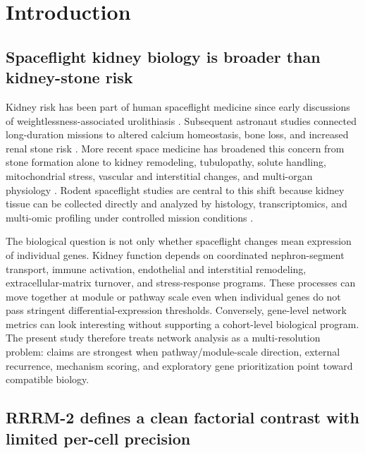 \documentclass[11pt]{article}
\begin{document}
\clearpage
\tableofcontents
\clearpage

\section{Introduction}

\subsection{Spaceflight kidney biology is broader than kidney-stone risk}

Kidney risk has been part of human spaceflight medicine since early discussions of weightlessness-associated urolithiasis \citep{cockett1962astronautical}. Subsequent astronaut studies connected long-duration missions to altered calcium homeostasis, bone loss, and increased renal stone risk \citep{pietrzyk2007renal,smith2014men}. More recent space medicine has broadened this concern from stone formation alone to kidney remodeling, tubulopathy, solute handling, mitochondrial stress, vascular and interstitial changes, and multi-organ physiology \citep{siew2024cosmic,chouker2025impact,afshinnekoo2020fundamental}. Rodent spaceflight studies are central to this shift because kidney tissue can be collected directly and analyzed by histology, transcriptomics, and multi-omic profiling under controlled mission conditions \citep{daSilveira2020comprehensive,galazka2020rnaseq,finch2025strain}.

The biological question is not only whether spaceflight changes mean expression of individual genes. Kidney function depends on coordinated nephron-segment transport, immune activation, endothelial and interstitial remodeling, extracellular-matrix turnover, and stress-response programs. These processes can move together at module or pathway scale even when individual genes do not pass stringent differential-expression thresholds. Conversely, gene-level network metrics can look interesting without supporting a cohort-level biological program. The present study therefore treats network analysis as a multi-resolution problem: claims are strongest when pathway/module-scale direction, external recurrence, mechanism scoring, and exploratory gene prioritization point toward compatible biology.

\subsection{RRRM-2 defines a clean factorial contrast with limited per-cell precision}
\end{document}
